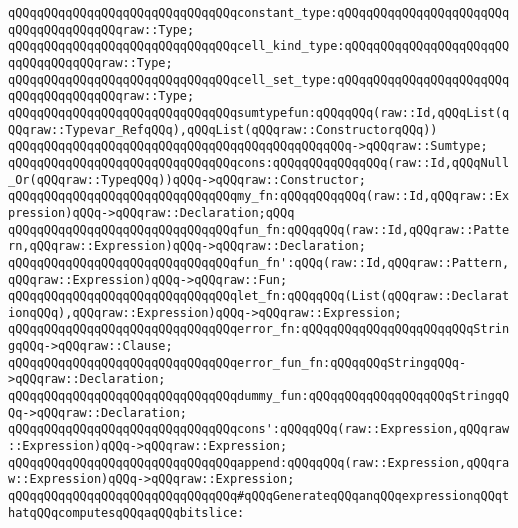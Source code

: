 \verb|qQQqqQQqqQQqqQQqqQQqqQQqqQQqqQQqconstant_type:qQQqqQQqqQQqqQQqqQQqqQQqqQQqqQQqqQQqqQQqraw::Type;|\newline
\verb|qQQqqQQqqQQqqQQqqQQqqQQqqQQqqQQqcell_kind_type:qQQqqQQqqQQqqQQqqQQqqQQqqQQqqQQqqQQqraw::Type;|\newline
\verb|qQQqqQQqqQQqqQQqqQQqqQQqqQQqqQQqcell_set_type:qQQqqQQqqQQqqQQqqQQqqQQqqQQqqQQqqQQqqQQqraw::Type;|\newline
\newline
\verb|qQQqqQQqqQQqqQQqqQQqqQQqqQQqqQQqsumtypefun:qQQqqQQq(raw::Id,qQQqList(qQQqraw::Typevar_RefqQQq),qQQqList(qQQqraw::ConstructorqQQq))|\newline
\verb|qQQqqQQqqQQqqQQqqQQqqQQqqQQqqQQqqQQqqQQqqQQqqQQq->qQQqraw::Sumtype;|\newline
\verb|qQQqqQQqqQQqqQQqqQQqqQQqqQQqqQQqcons:qQQqqQQqqQQqqQQq(raw::Id,qQQqNull_Or(qQQqraw::TypeqQQq))qQQq->qQQqraw::Constructor;|\newline
\verb|qQQqqQQqqQQqqQQqqQQqqQQqqQQqqQQqmy_fn:qQQqqQQqqQQq(raw::Id,qQQqraw::Expression)qQQq->qQQqraw::Declaration;qQQq|\newline
\verb|qQQqqQQqqQQqqQQqqQQqqQQqqQQqqQQqfun_fn:qQQqqQQq(raw::Id,qQQqraw::Pattern,qQQqraw::Expression)qQQq->qQQqraw::Declaration;|\newline
\verb|qQQqqQQqqQQqqQQqqQQqqQQqqQQqqQQqfun_fn':qQQq(raw::Id,qQQqraw::Pattern,qQQqraw::Expression)qQQq->qQQqraw::Fun;|\newline
\verb|qQQqqQQqqQQqqQQqqQQqqQQqqQQqqQQqlet_fn:qQQqqQQq(List(qQQqraw::DeclarationqQQq),qQQqraw::Expression)qQQq->qQQqraw::Expression;|\newline
\newline
\verb|qQQqqQQqqQQqqQQqqQQqqQQqqQQqqQQqerror_fn:qQQqqQQqqQQqqQQqqQQqqQQqStringqQQq->qQQqraw::Clause;|\newline
\verb|qQQqqQQqqQQqqQQqqQQqqQQqqQQqqQQqerror_fun_fn:qQQqqQQqStringqQQq->qQQqraw::Declaration;|\newline
\verb|qQQqqQQqqQQqqQQqqQQqqQQqqQQqqQQqdummy_fun:qQQqqQQqqQQqqQQqqQQqStringqQQq->qQQqraw::Declaration;|\newline
\newline
\verb|qQQqqQQqqQQqqQQqqQQqqQQqqQQqqQQqcons':qQQqqQQq(raw::Expression,qQQqraw::Expression)qQQq->qQQqraw::Expression;|\newline
\verb|qQQqqQQqqQQqqQQqqQQqqQQqqQQqqQQqappend:qQQqqQQq(raw::Expression,qQQqraw::Expression)qQQq->qQQqraw::Expression;|\newline
\newline
\verb|qQQqqQQqqQQqqQQqqQQqqQQqqQQqqQQq#qQQqGenerateqQQqanqQQqexpressionqQQqthatqQQqcomputesqQQqaqQQqbitslice:|\newline
